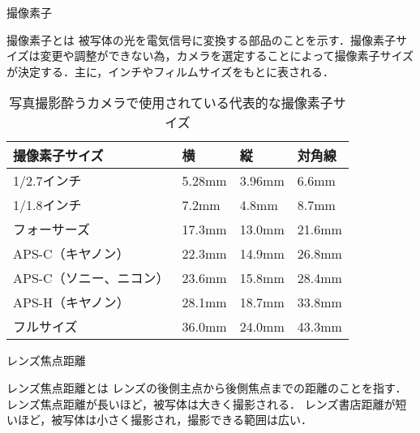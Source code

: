 \documentclass[8pt, jfont=ipaexm, t]{beamer} %
\begin{document}
\begin{frame}{撮像素子}
  \begin{block}{撮像素子とは}
    被写体の光を電気信号に変換する部品のことを示す．撮像素子サイズは変更や調整ができない為，カメラを選定することによって撮像素子サイズが決定する．主に，インチやフィルムサイズをもとに表される．
  \end{block}

  \begin{table}[H]
    \centering
    \caption{写真撮影酔うカメラで使用されている代表的な撮像素子サイズ}
    \begin{tabular}{|l|lll|}
      \hline
      撮像素子サイズ & 横 & 縦 & 対角線 \\
      \hline
      1/2.7インチ & 5.28mm & 3.96mm & 6.6mm \\
      1/1.8インチ & 7.2mm & 4.8mm & 8.7mm \\
      フォーサーズ & 17.3mm & 13.0mm & 21.6mm \\
      APS-C（キヤノン） & 22.3mm & 14.9mm & 26.8mm \\
      APS-C（ソニー、ニコン） & 23.6mm & 15.8mm & 28.4mm \\
      APS-H（キヤノン） & 28.1mm & 18.7mm & 33.8mm \\
      フルサイズ & 36.0mm & 24.0mm & 43.3mm \\
      \hline
    \end{tabular}
  \end{table}
\end{frame}


\begin{frame}{レンズ焦点距離}
  \begin{block}{レンズ焦点距離とは}
    レンズの後側主点から後側焦点までの距離のことを指す．
    レンズ焦点距離が長いほど，被写体は大きく撮影される．
    レンズ書店距離が短いほど，被写体は小さく撮影され，撮影できる範囲は広い．
  \end{block}
\end{frame}
\end{document}
